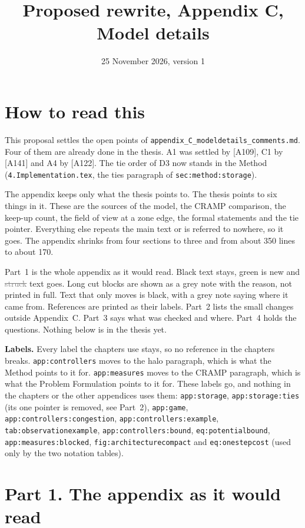 \documentclass[11pt,a4paper]{article}
\title{Proposed rewrite, Appendix C, Model details}
\date{25 November 2026, version 1}
\newcommand{\new}[1]{\textcolor{newc}{#1}}
\newcommand{\old}[1]{\textcolor{gray}{\sout{#1}}}
\newcommand{\lref}[1]{{\small\texttt{#1}}}
\begin{document}
\sloppy
\maketitle

\section*{How to read this}
This proposal settles the open points of
\texttt{appendix\_C\_modeldetails\_comments.md}. Four of them are already
done in the thesis. A1 was settled by [A109], C1 by [A141] and A4 by
[A122]. The tie order of D3 now stands in the Method
(\texttt{4.Implementation.tex}, the ties paragraph of
\lref{sec:method:storage}).

The appendix keeps only what the thesis points to. The thesis points to six
things in it. These are the sources of the model, the CRAMP comparison, the
keep-up count, the field of view at a zone edge, the formal statements and
the tie pointer. Everything else repeats the main text or is referred to
nowhere, so it goes. The appendix shrinks from four sections to three and
from about 350 lines to about 170.

Part~1 is the whole appendix as it would read. Black text stays,
\new{green} is new and \old{struck} text goes. Long cut blocks are shown as
a grey note with the reason, not printed in full. Text that only moves is
black, with a grey note saying where it came from. References are printed as
their labels. Part~2 lists the small changes outside Appendix~C. Part~3 says
what was checked and where. Part~4 holds the questions. Nothing below is in
the thesis yet.

\textbf{Labels.} Every label the chapters use stays, so no reference in the
chapters breaks. \lref{app:controllers} moves to the halo paragraph, which is
what the Method points to it for. \lref{app:measures} moves to the CRAMP
paragraph, which is what the Problem Formulation points to it for. These
labels go, and nothing in the chapters or the other appendices uses them:
\lref{app:storage}, \lref{app:storage:ties} (its one pointer is removed, see
Part~2), \lref{app:game}, \lref{app:controllers:congestion},
\lref{app:controllers:example}, \lref{tab:observationexample},
\lref{app:controllers:bound}, \lref{eq:potentialbound},
\lref{app:measures:blocked}, \lref{fig:architecturecompact} and
\lref{eq:onestepcost} (used only by the two notation tables).

\section*{Part 1. The appendix as it would read}
\end{document}
